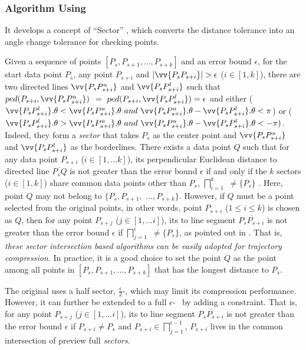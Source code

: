 \subsubsection{Algorithm \siped Using \ped \cite{Williams:Longest, Sklansky:Cone, Dunham:Cone, Zhao:Sleeve}}
It develops a concept of ``Sector'' \cite{Williams:Longest, Sklansky:Cone, Dunham:Cone, Zhao:Sleeve}, which converts the distance tolerance into an angle change tolerance for checking  points.

Given a sequence of points $[P_{s}, P_{s+1}, \ldots, P_{s+k}]$ and an error bound $\epsilon$,
for the start data point $P_s$, any point $P_{s+i}$ and $|\vv{P_sP_{s+i}}|>\epsilon$ ($i\in[1, k]$), there are two directed lines $\vv{P_sP^u_{s+i}}$ and $\vv{P_sP^l_{s+i}}$ such that $ped(P_{s+i}, \vv{P_sP^u_{s+i}})$ $=$ $ped(P_{s+i}, \vv{P_sP^l_{s+i}}) = \epsilon$ and either ($\vv{P_sP^l_{s+i}}.\theta < \vv{P_sP^u_{s+i}}.\theta ~and~\vv{P_sP^u_{s+i}}.\theta - \vv{P_sP^l_{s+i}}.\theta <\pi$) or ($\vv{P_sP^l_{s+i}}.\theta > \vv{P_sP^u_{s+i}}.\theta ~and~ \vv{P_sP^u_{s+i}}.\theta - \vv{P_sP^l_{s+i}}.\theta < -\pi)$. Indeed, they form a \emph{sector}  that takes $P_s$ as the center point and $\vv{P_sP^u_{s+i}}$ and $\vv{P_sP^l_{s+i}}$ as the borderlines.
%
There exists a data point $Q$ such that for any data point $P_{s+i}$ ($i \in [1, ... k]$), its perpendicular Euclidean distance to
directed line $\overline{P_sQ}$ is not greater than the error bound $\epsilon$ if and only if the $k$ sectors  ($i\in[1,k]$) share common data points other than $P_s$, \ie $\bigsqcap_{i=1}^{k}$ $\ne \{P_s\}$ \cite{Williams:Longest, Sklansky:Cone,Zhao:Sleeve}.
%
Here, point $Q$ may not belong to $\{P_{s}, P_{s+1},$ $\ldots, P_{s+k}\}$.
However, if $Q$ must be a point selected from the original points, in other words, point $P_{s+i}$ ($1\le i\le k$) is chosen as $Q$, then
for any point $P_{s+j}$ ($j \in [1, ... i]$), its \ped to
line segment $\overline{P_sP_{s+i}}$ is not greater than the error bound $\epsilon$ if $\bigsqcap_{j=1}^{i}$ $\ne \{P_s\}$, as pointed out in \cite{Zhao:Sleeve}.
That is, {\em these sector intersection based algorithms can be easily adopted for trajectory compression}.
In practice, it is a good choice to set the point $Q$ as the point among all points in $[P_{s}, P_{s+1}, \ldots, P_{s+k}]$ that has the longest distance to $P_s$.


The original \siped uses a half sector, $\frac{\epsilon}{2}$-\sector, which may limit its compression performance. However, it can further be extended to a full ${\epsilon}$-\sector ~ by adding a constraint. That is, for any point $P_{s+j}$ ($j \in [1, ... i]$), its \ped to
line segment $\overline{P_sP_{s+i}}$ is not greater than the error bound $\epsilon$ if $ P_{s+i} \ne {P_s}$ and $P_{s+i}\in \bigsqcap_{j=1}^{i-1}$, \ie $P_{s+i}$ lives in the common intersection of preview full \emph{sectors}.



